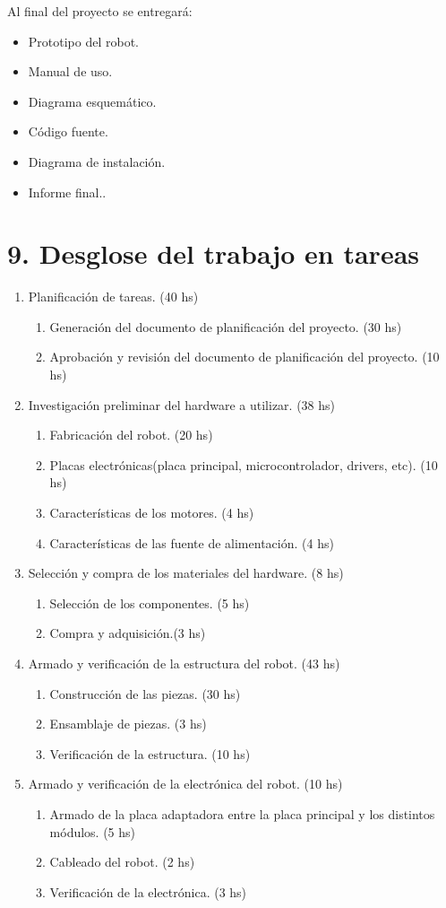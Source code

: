 \documentclass[
11pt, %
codirector, %
]{charter}
\begin{document}
Al final del proyecto se entregará: 
\begin{itemize}
\item Prototipo del robot.
\item Manual de uso.
\item Diagrama esquemático.
\item Código fuente.
\item Diagrama de instalación.
\item Informe final..
\end{itemize}


\section{9. Desglose del trabajo en tareas}
\label{sec:wbs}

\begin{enumerate}
\item Planificación de tareas. (40 hs)
	\begin{enumerate}
	\item Generación del documento de planificación del proyecto. (30 hs)
	\item Aprobación y revisión del documento de planificación del proyecto. (10 hs)
	\end{enumerate}
\item Investigación preliminar del hardware a utilizar. (38 hs)
	\begin{enumerate}
	\item Fabricación del robot. (20 hs)
	\item Placas electrónicas(placa principal, microcontrolador, drivers, etc). (10 hs)
	\item Características de los motores.  (4 hs)
	\item Características de las fuente de alimentación. (4 hs)
	\end{enumerate}
\item Selección y compra de los materiales del hardware. (8 hs)
	\begin{enumerate}
	\item Selección de los componentes. (5 hs)
	\item Compra y adquisición.(3 hs)
	\end{enumerate}
\item Armado y verificación de la estructura del robot. (43 hs)
	\begin{enumerate}
	\item Construcción de las piezas. (30 hs)
	\item Ensamblaje de piezas. (3 hs)
	\item Verificación de la estructura. (10 hs)
	\end{enumerate}
\item Armado y verificación de la electrónica del robot. (10 hs)
	\begin{enumerate}
	\item Armado de la placa adaptadora entre la placa principal y los distintos módulos. (5 hs)
	\item Cableado del robot. (2 hs)
	\item Verificación de la electrónica. (3 hs)
	\end{enumerate}	


\end{enumerate}
\end{document}
